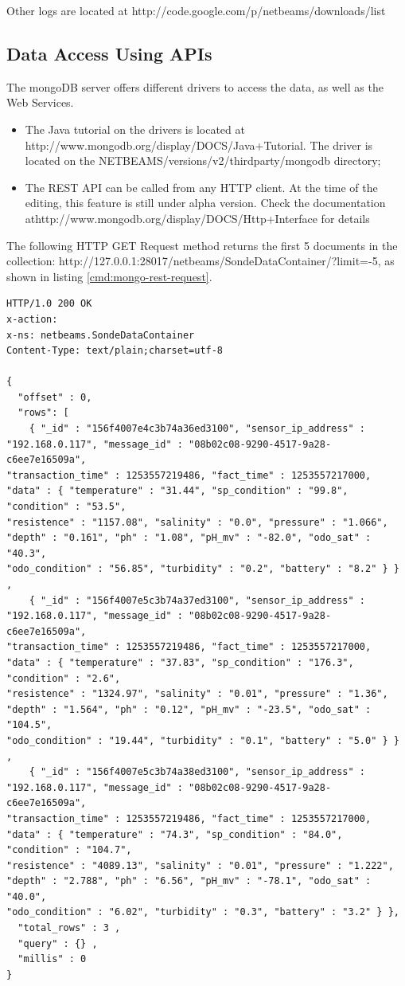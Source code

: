 Other logs are located at
http://code.google.com/p/netbeams/downloads/list

\subsection{Data Access Using APIs}

The mongoDB server offers different drivers to access the data, as well as the
Web Services.

\begin{itemize}
  \item The Java tutorial on the drivers is located at
    http://www.mongodb.org/display/DOCS/Java+Tutorial. The driver is located on
    the NETBEAMS/versions/v2/thirdparty/mongodb directory;  
  \item The REST API can be called from any HTTP client. At the time of the
  editing, this feature is still under alpha version. Check the documentation
  athttp://www.mongodb.org/display/DOCS/Http+Interface for details 
\end{itemize}

The following HTTP GET Request method returns the first 5 documents in the collection:
http://127.0.0.1:28017/netbeams/SondeDataContainer/?limit=-5, as shown in
listing \ref{cmd:mongo-rest-request}.

\lstset{label=cmd:mongo-rest-request,caption=REST HTTP GET Request Example}
\begin{lstlisting}
HTTP/1.0 200 OK
x-action:
x-ns: netbeams.SondeDataContainer
Content-Type: text/plain;charset=utf-8

{
  "offset" : 0,
  "rows": [
    { "_id" : "156f4007e4c3b74a36ed3100", "sensor_ip_address" : "192.168.0.117", "message_id" : "08b02c08-9290-4517-9a28-c6ee7e16509a",
"transaction_time" : 1253557219486, "fact_time" : 1253557217000, "data" : { "temperature" : "31.44", "sp_condition" : "99.8", "condition" : "53.5",
"resistence" : "1157.08", "salinity" : "0.0", "pressure" : "1.066", "depth" : "0.161", "ph" : "1.08", "pH_mv" : "-82.0", "odo_sat" : "40.3",
"odo_condition" : "56.85", "turbidity" : "0.2", "battery" : "8.2" } } ,
    { "_id" : "156f4007e5c3b74a37ed3100", "sensor_ip_address" : "192.168.0.117", "message_id" : "08b02c08-9290-4517-9a28-c6ee7e16509a",
"transaction_time" : 1253557219486, "fact_time" : 1253557217000, "data" : { "temperature" : "37.83", "sp_condition" : "176.3", "condition" : "2.6",
"resistence" : "1324.97", "salinity" : "0.01", "pressure" : "1.36", "depth" : "1.564", "ph" : "0.12", "pH_mv" : "-23.5", "odo_sat" : "104.5",
"odo_condition" : "19.44", "turbidity" : "0.1", "battery" : "5.0" } } ,
    { "_id" : "156f4007e5c3b74a38ed3100", "sensor_ip_address" : "192.168.0.117", "message_id" : "08b02c08-9290-4517-9a28-c6ee7e16509a",
"transaction_time" : 1253557219486, "fact_time" : 1253557217000, "data" : { "temperature" : "74.3", "sp_condition" : "84.0", "condition" : "104.7",
"resistence" : "4089.13", "salinity" : "0.01", "pressure" : "1.222", "depth" : "2.788", "ph" : "6.56", "pH_mv" : "-78.1", "odo_sat" : "40.0",
"odo_condition" : "6.02", "turbidity" : "0.3", "battery" : "3.2" } },
  "total_rows" : 3 ,
  "query" : {} ,
  "millis" : 0
}
\end{lstlisting}

